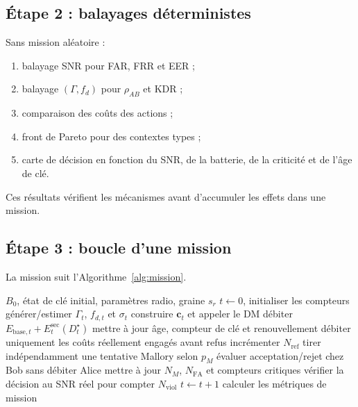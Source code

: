 \documentclass[conference,a4paper]{IEEEtran}
\begin{document}
\subsection{Étape 2 : balayages déterministes}
Sans mission aléatoire :
\begin{enumerate}
    \item balayage SNR pour FAR, FRR et EER ;
    \item balayage $(\Gamma,f_d)$ pour $\rho_{AB}$ et KDR ;
    \item comparaison des coûts des actions ;
    \item front de Pareto pour des contextes types ;
    \item carte de décision en fonction du SNR, de la batterie, de la criticité et de l'âge de clé.
\end{enumerate}
Ces résultats vérifient les mécanismes avant d'accumuler les effets dans une mission.

\subsection{Étape 3 : boucle d'une mission}
La mission suit l'Algorithme~\ref{alg:mission}.

\begin{algorithm}[t]
\caption{Mission d'Alice et processus d'attaque séparé}
\label{alg:mission}
\begin{algorithmic}[1]
\Require $B_0$, état de clé initial, paramètres radio, graine $s_r$
\State $t\gets0$, initialiser les compteurs
    \State générer/estimer $\Gamma_t$, $f_{d,t}$ et $\sigma_t$
    \State construire $\mathbf{c}_t$ et appeler le DM
        \State débiter $E_{\mathrm{base},t}+E_t^{\mathrm{sec}}(D_t^\star)$
        \State mettre à jour âge, compteur de clé et renouvellement
    \Else
        \State débiter uniquement les coûts réellement engagés avant refus
        \State incrémenter $N_{\mathrm{ref}}$
    \EndIf
    \State tirer indépendamment une tentative Mallory selon $p_M$
        \State évaluer acceptation/rejet chez Bob sans débiter Alice
        \State mettre à jour $N_M$, $N_{\mathrm{FA}}$ et compteurs critiques
    \EndIf
    \State vérifier la décision au SNR réel pour compter $N_{\mathrm{viol}}$
    \State $t\gets t+1$
\EndWhile
\State calculer les métriques de mission
\end{algorithmic}
\end{algorithm}
\end{document}
